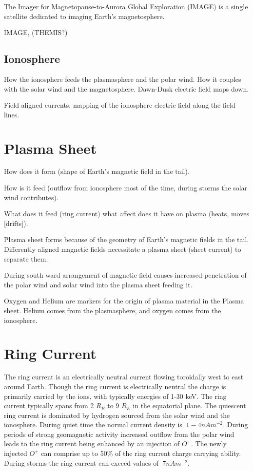 \documentclass[utf8]{report}
\begin{document}
 The Imager for Magnetopause-to-Aurora Global Exploration (IMAGE) is a single satellite dedicated to imaging Earth's magnetosphere. 
 
 IMAGE, (THEMIS?) 

\subsection{Ionosphere}

How the ionosphere feeds the plasmasphere and the polar wind. How it couples with the solar wind and the magnetosphere. Dawn-Dusk electric field maps down. 

Field aligned currents, mapping of the ionosphere electric field along the field lines. 

\section{Plasma Sheet}

How does it form (shape of Earth's magnetic field in the tail). 

How is it feed (outflow from ionosphere most of the time, during storms the solar wind contributes). 

What does it feed (ring current) what affect does it have on plasma (heats, moves [drifts]). 

Plasma sheet forms because of the geometry of Earth’s magnetic fields in the tail. Differently aligned magnetic fields necessitate a plasma sheet (sheet current) to separate them. 

During south ward arrangement of magnetic field causes increased penetration of the polar wind and solar wind into the plasma sheet feeding it.
    
Oxygen and Helium are markers for the origin of plasma material in the Plasma sheet. Helium comes from the plasmasphere, and oxygen comes from the ionosphere.


\section{Ring Current}

The ring current is an electrically neutral current flowing toroidally west to east around Earth. Though the ring current is electrically neutral the charge is primarily carried by the ions, with typically energies of 1-30 keV. The ring current typically spans from 2 $R_{E}$ to 9 $R_{E}$ in the equatorial plane. The quiescent ring current is dominated by hydrogen sourced from the solar wind and the ionosphere. During quiet time the normal current density is $~1-4 nA m^{-2}$. During periods of strong geomagnetic activity increased outflow from the polar wind leads to the ring current being enhanced by an injection of $O^{+}$. The newly injected $O^{+}$ can comprise up to 50\% of the ring current charge carrying ability. During storms the ring current can exceed values of $~7 nA m^{-2}$. 
\end{document}
